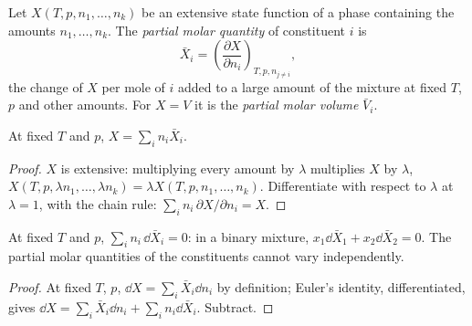 \begin{definition}\label{def:b2:chemical-potential:partial-molar}
Let $X(T, p, n_1, \dots, n_k)$ be an extensive state function of a phase
containing the amounts $n_1, \dots, n_k$. The \emph{partial molar
quantity} of constituent $i$ is
\[
  \bar X_i = \left(\frac{\partial X}{\partial n_i}\right)_{T, p, n_{j \ne i}} ,
\]
the change of $X$ per mole of $i$ added to a large amount of the mixture
at fixed $T$, $p$ and other amounts. For $X = V$ it is the \emph{partial
molar volume} $\bar V_i$.
\end{definition}

\begin{theorem}\label{thm:b2:chemical-potential:euler}
At fixed $T$ and $p$, $X = \sum_i n_i\bar X_i$.
\end{theorem}

\begin{proof}
$X$ is extensive: multiplying every amount by $\lambda$ multiplies $X$ by
$\lambda$, $X(T, p, \lambda n_1, \dots, \lambda n_k) = \lambda X(T, p, n_1,
\dots, n_k)$. Differentiate with respect to $\lambda$ at $\lambda = 1$, with
the chain rule: $\sum_i n_i\,\partial X/\partial n_i = X$.
\end{proof}

\begin{proposition}\label{prop:b2:chemical-potential:gibbs-duhem}
At fixed $T$ and $p$, $\sum_i n_i\,\dd\bar X_i = 0$: in a binary mixture,
$x_1\dd\bar X_1 + x_2\dd\bar X_2 = 0$. The partial molar quantities of the
constituents cannot vary independently.
\end{proposition}

\begin{proof}
At fixed $T$, $p$, $\dd X = \sum_i\bar X_i\dd n_i$ by definition; Euler's
identity, differentiated, gives $\dd X = \sum_i\bar X_i\dd n_i + \sum_i
n_i\dd\bar X_i$. Subtract.
\end{proof}

